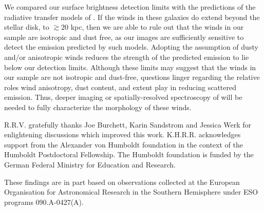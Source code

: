 \documentclass[twocolumn]{aastex62}
\begin{document}
We compared our surface brightness detection limits with the predictions of the radiative transfer models of \cite{Prochaska_2011}. If the winds in these galaxies do extend beyond the stellar disk, to $\gtrsim 20$ kpc, then we are able to rule out that the winds in our sample are isotropic and dust free, as our images are sufficiently sensitive to detect the emission predicted by such models. Adopting the assumption of dusty and/or anisotropic winds reduces the strength of the predicted  emission to lie below our detection limits. Although these limits may suggest that the winds in our sample are not isotropic and dust-free, questions linger regarding the relative roles wind anisotropy, dust content, and extent play in reducing scattered emission. Thus, deeper imaging or spatially-resolved spectroscopy of  will be needed to fully characterize the morphology of these winds. 

\acknowledgements
R.R.V. gratefully thanks Joe Burchett, Karin Sandstrom and Jessica Werk for enlightening discussions which improved this work.
K.H.R.R. acknowledges support from the Alexander von Humboldt foundation in the context of the Humboldt Postdoctoral Fellowship. The Humboldt foundation is funded by the German Federal Ministry for Education and Research.

These findings are in part based on observations collected at the
European Organisation for Astronomical Research in the Southern
Hemisphere under ESO programs 090.A-0427(A).

\newpage

\end{document}
